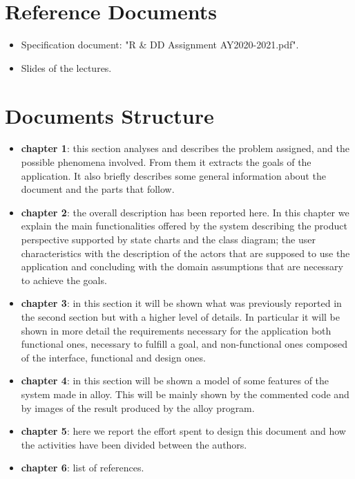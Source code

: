\section{Reference Documents}

\begin{itemize}
    \item Specification document: "R \& DD Assignment AY2020-2021.pdf".
    \item Slides of the lectures.
\end{itemize}


\section{Documents Structure}

\begin{itemize}
    \item \textbf{chapter 1}: this section analyses and describes the problem assigned, and the possible phenomena involved. From them it extracts the goals of the application. It also briefly describes some general information about the document and the parts that follow.
    \item \textbf{chapter 2}: the overall description has been reported here. In this chapter we explain the main functionalities offered by the system describing the product perspective supported by state charts and the class diagram; the user characteristics with the description of the actors that are supposed to use the application and concluding with the domain assumptions that are necessary to achieve the goals.
    \item \textbf{chapter 3}: in this section it will be shown what was previously reported in the second section but with a higher level of details. In particular it will be shown in more detail the requirements necessary for the application both functional ones, necessary to fulfill a goal, and non-functional ones composed of the interface, functional and design ones.
    \item \textbf{chapter 4}: in this section will be shown a model of some features of the system made in alloy. This will be mainly shown by the commented code and by images of the result produced by the alloy program.
    \item \textbf{chapter 5}: here we report the effort spent to design this document and how the activities have been divided between the authors.
    \item \textbf{chapter 6}: list of references.
\end{itemize}